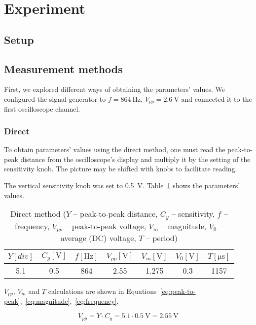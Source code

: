\section{Experiment}
\subsection{Setup}

\subsection{Measurement methods}

First, we explored different ways of obtaining the parameters' values. We configured the signal generator to $f = \SI{864}{\hertz}$, $V_{pp} = \SI{2.6}{\volt}$ and connected it to the first oscilloscope channel.

\subsubsection*{Direct}

 To obtain parameters' values using the direct method, one must read the peak-to-peak distance from the oscilloscope's display and multiply it by the setting of the sensitivity knob. The picture may be shifted with knobs to facilitate reading.

The vertical sensitivity knob was set to \SI{0.5}{\volt}. Table~\ref{tab:direct-method} shows the parameters' values.

\begin{table}[H]
	\centering
	\begin{tabular}{c|c|c|c|c|c|c}
		$Y [div]$ & $C_{y} [\unit{\volt}]$ & $f [\unit{\hertz}]$ & $V_{pp} [\unit{\volt}]$ & $V_{m} [\unit{\volt}]$ & $V_{0} [\unit{\volt}]$ & $T [\unit{\micro\second}]$\\
		\hline
		5.1 & 0.5 & 864 & 2.55 & 1.275 & 0.3 & 1157
	\end{tabular}
	\caption{Direct method ($Y$ -- peak-to-peak distance, $C_{y}$ -- sensitivity, $f$ -- frequency, $V_{pp}$ -- peak-to-peak voltage, $V_{m}$ -- magnitude, $V_{0}$ -- average (DC) voltage, $T$ -- period)}
	\label{tab:direct-method}
\end{table}

$V_{pp}$, $V_{m}$ and $T$ calculations are shown in Equations~\ref{eq:peak-to-peak},~\ref{eq:magnitude},~\ref{eq:frequency}.


\begin{equation}
	V_{pp} = Y\cdot C_{y} = 5.1\cdot \SI{0.5}{\volt} = \SI{2.55}{\volt}
	\label{eq:peak-to-peak}
\end{equation}

